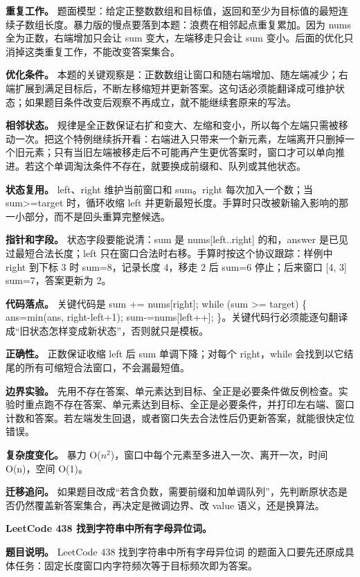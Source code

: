 \textbf{重复工作。} 题面模型：给定正整数数组和目标值，返回和至少为目标值的最短连续子数组长度。暴力版的慢点要落到本题：浪费在相邻起点重复累加。因为 nums 全为正数，右端增加只会让 sum 变大，左端移走只会让 sum 变小。后面的优化只消掉这类重复工作，不能改变答案集合。

\textbf{优化条件。} 本题的关键观察是：正数数组让窗口和随右端增加、随左端减少；右端扩展到满足目标后，不断左移缩短并更新答案。这句话必须能翻译成可维护状态；如果题目条件改变后观察不再成立，就不能继续套原来的写法。

\textbf{相邻状态。} 规律是全正数保证右扩和变大、左缩和变小，所以每个左端只需被移动一次。把这个特例继续拆开看：右端进入只带来一个新元素，左端离开只删掉一个旧元素；只有当旧左端被移走后不可能再产生更优答案时，窗口才可以单向推进。若这个单调淘汰条件不存在，就要换成前缀和、队列或其他状态。

\textbf{状态复用。} left、right 维护当前窗口和 sum。right 每次加入一个数；当 sum>=target 时，循环收缩 left 并更新最短长度。手算时只改被新输入影响的那一小部分，而不是回头重算完整候选。

\textbf{指针和字段。} 状态字段要能说清：sum 是 nums[left..right] 的和，answer 是已见过最短合法长度；left 只在窗口合法时右移。手算时按这个协议跟踪：样例中 right 到下标 3 时 sum=8，记录长度 4，移走 2 后 sum=6 停止；后来窗口 [4, 3] sum=7，答案更新为 2。

\textbf{代码落点。} 关键代码是 sum += nums[right]; while (sum >= target) \{ ans=min(ans, right-left+1); sum-=nums[left++]; \}。关键代码行必须能逐句翻译成“旧状态怎样变成新状态”，否则就只是模板。

\textbf{正确性。} 正数保证收缩 left 后 sum 单调下降；对每个 right，while 会找到以它结尾的所有可缩短合法窗口，不会漏最短值。

\textbf{边界实验。} 先用不存在答案、单元素达到目标、全正是必要条件做反例检查。实验时重点跑不存在答案、单元素达到目标、全正是必要条件，并打印左右端、窗口计数和答案。若左端发生回退，或者窗口失去合法性后仍更新答案，就能很快定位错误。

\textbf{复杂度变化。} 暴力 O(\ensuremath{n^{2}})，窗口中每个元素至多进入一次、离开一次，时间 O(n)，空间 O(1)。

\textbf{迁移追问。} 如果题目改成“若含负数，需要前缀和加单调队列”，先判断原状态是否仍然覆盖新答案集合，再决定是微调边界、改 value 语义，还是换算法。

\noindent\textbf{LeetCode 438 找到字符串中所有字母异位词。}

\textbf{题目说明。} LeetCode 438 找到字符串中所有字母异位词 的题面入口要先还原成具体任务：固定长度窗口内字符频次等于目标频次即为答案。

